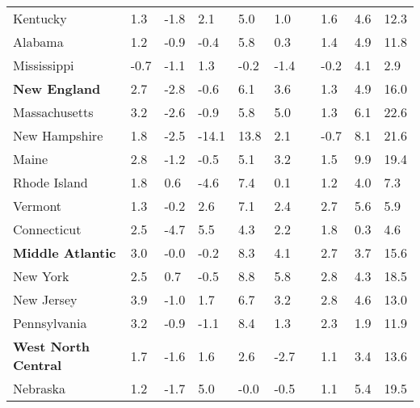 {\begin{tabular}{p{30mm} R{7mm} R{7mm} R{7mm} R{7mm} 
             R{7mm} p{0mm} R{9mm} R{9mm} R{10mm} }
\hspace{3mm}  Kentucky  & 1.3 & -1.8 & 2.1 & 5.0 & 1.0 &  & 1.6 & 4.6 & 12.3 \\
\hspace{3mm}  Alabama  & 1.2 & -0.9 & -0.4 & 5.8 & 0.3 &  & 1.4 & 4.9 & 11.8 \\
\hspace{3mm}  Mississippi  & -0.7 & -1.1 & 1.3 & -0.2 & -1.4 &  & -0.2 & 4.1 & 2.9 \\
\hspace{1mm} \textbf{New England}  & 2.7 & -2.8 & -0.6 & 6.1 & 3.6 &  & 1.3 & 4.9 & 16.0 \\
\hspace{3mm}  Massachusetts  & 3.2 & -2.6 & -0.9 & 5.8 & 5.0 &  & 1.3 & 6.1 & 22.6 \\
\hspace{3mm}  New Hampshire  & 1.8 & -2.5 & -14.1 & 13.8 & 2.1 &  & -0.7 & 8.1 & 21.6 \\
\hspace{3mm}  Maine  & 2.8 & -1.2 & -0.5 & 5.1 & 3.2 &  & 1.5 & 9.9 & 19.4 \\
\hspace{3mm}  Rhode Island  & 1.8 & 0.6 & -4.6 & 7.4 & 0.1 &  & 1.2 & 4.0 & 7.3 \\
\hspace{3mm}  Vermont  & 1.3 & -0.2 & 2.6 & 7.1 & 2.4 &  & 2.7 & 5.6 & 5.9 \\
\hspace{3mm}  Connecticut  & 2.5 & -4.7 & 5.5 & 4.3 & 2.2 &  & 1.8 & 0.3 & 4.6 \\
\hspace{1mm} \textbf{Middle Atlantic}  & 3.0 & -0.0 & -0.2 & 8.3 & 4.1 &  & 2.7 & 3.7 & 15.6 \\
\hspace{3mm}  New York  & 2.5 & 0.7 & -0.5 & 8.8 & 5.8 &  & 2.8 & 4.3 & 18.5 \\
\hspace{3mm}  New Jersey  & 3.9 & -1.0 & 1.7 & 6.7 & 3.2 &  & 2.8 & 4.6 & 13.0 \\
\hspace{3mm}  Pennsylvania  & 3.2 & -0.9 & -1.1 & 8.4 & 1.3 &  & 2.3 & 1.9 & 11.9 \\
\hspace{1mm} \textbf{West North Central}  & 1.7 & -1.6 & 1.6 & 2.6 & -2.7 &  & 1.1 & 3.4 & 13.6 \\
\hspace{3mm}  Nebraska  & 1.2 & -1.7 & 5.0 & -0.0 & -0.5 &  & 1.1 & 5.4 & 19.5 \\

\end{tabular}}

